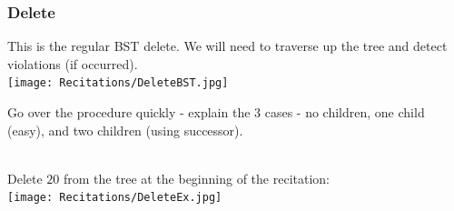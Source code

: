 \subsubsection{Delete}
This is the regular BST delete. We will need to traverse up the
tree and detect violations (if occurred).\\
\texttt{[image: Recitations/DeleteBST.jpg]}\\
\begin{remark} Go over the procedure quickly - explain the 3 cases - no
children, one child (easy), and two children (using successor).
\end{remark}
\begin{example}\\
    Delete $20$ from the tree at the beginning of the recitation:\\
    \texttt{[image: Recitations/DeleteEx.jpg]}
\end{example}
%
%
%
